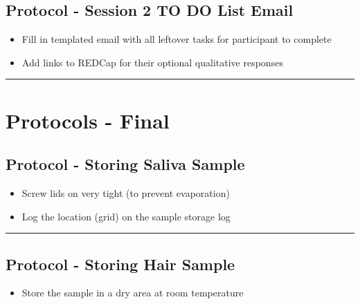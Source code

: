 \documentclass[]{book}
\providecommand{\tightlist}{%
  \setlength{\itemsep}{0pt}\setlength{\parskip}{0pt}}
\begin{document}
\hypertarget{protocol---session-2-to-do-list-email}{%
\subsection{Protocol - Session 2 TO DO List Email}\label{protocol---session-2-to-do-list-email}}

\begin{itemize}
\tightlist
\item
  Fill in templated email with all leftover tasks for participant to complete
\item
  Add links to REDCap for their optional qualitative responses
\end{itemize}

\begin{center}\rule{0.5\linewidth}{0.5pt}\end{center}

\hypertarget{protocols---final}{%
\section{Protocols - Final}\label{protocols---final}}

\hypertarget{protocol---storing-saliva-sample}{%
\subsection{Protocol - Storing Saliva Sample}\label{protocol---storing-saliva-sample}}

\begin{itemize}
\tightlist
\item
  Screw lids on very tight (to prevent evaporation)
\item
  Log the location (grid) on the sample storage log
\end{itemize}

\begin{center}\rule{0.5\linewidth}{0.5pt}\end{center}

\hypertarget{protocol---storing-hair-sample}{%
\subsection{Protocol - Storing Hair Sample}\label{protocol---storing-hair-sample}}

\begin{itemize}
\tightlist
\item
  Store the sample in a dry area at room temperature
\end{itemize}
\end{document}
